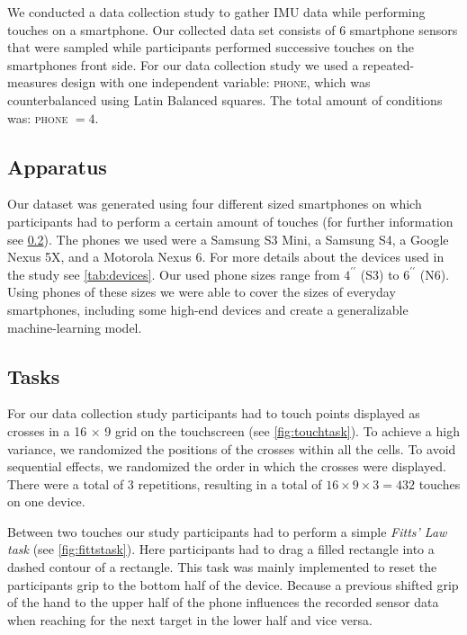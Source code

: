 We conducted a data collection study to gather IMU data while performing touches on a smartphone.
Our collected data set consists of 6 smartphone sensors that were sampled while participants performed successive touches on the smartphones front side. 
For our data collection study we used a repeated-measures design with one independent variable: \textsc{phone}, which was counterbalanced using Latin Balanced squares. 
The total amount of conditions was: \textsc{phone} $ = 4$.

\subsection{Apparatus}
Our dataset was generated using four different sized smartphones on which participants had to perform a certain amount of touches (for further information see \cref{sec:tasks}).
The phones we used were a Samsung S3 Mini, a Samsung S4, a Google Nexus 5X, and a Motorola Nexus 6.
For more details about the devices used in the study see \cref{tab:devices}.
Our used phone sizes range from $ 4^{\prime\prime} $ (S3) to $ 6^{\prime\prime} $ (N6). 
Using phones of these sizes we were able to cover the sizes of everyday smartphones, including some high-end devices and create a generalizable machine-learning model.



\subsection{Tasks}
\label{sec:tasks}




For our data collection study participants had to touch points displayed as crosses in a 16 $ \times $ 9 grid on the touchscreen (see \cref{fig:touchtask}). 
To achieve a high variance, we randomized the positions of the crosses within all the cells.
To avoid sequential effects, we randomized the order in which the crosses were displayed.
There were a total of 3 repetitions, resulting in a total  of $ 16 \times 9 \times 3 = 432 $ touches on one device.

Between two touches our study participants had to perform a simple \textit{Fitts' Law task} (see \cref{fig:fittstask}). 
Here participants had to drag a filled rectangle into a dashed contour of a rectangle.
This task was mainly implemented to reset the participants grip to the bottom half of the device.
Because a previous shifted grip of the hand to the upper half of the phone influences the recorded sensor data when reaching for the next target in the lower half and vice versa.
